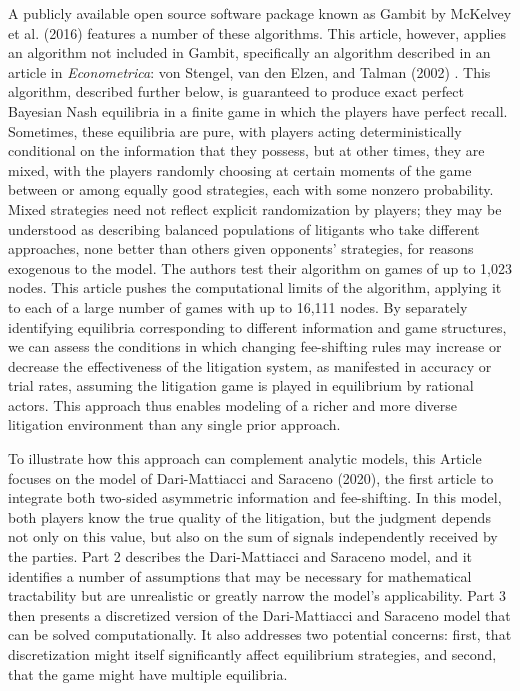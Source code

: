 \documentclass{article}
\begin{document}
A publicly available open source software package known as Gambit by McKelvey et al. (2016) \cite{mckelvey} features a number of these algorithms. This article, however, applies an algorithm not included in Gambit, specifically an algorithm described in an article in \textit{Econometrica}: von Stengel, van den Elzen, and Talman (2002) \cite{vonstengelvandenelzentalman}. This algorithm, described further below, is guaranteed to produce exact perfect Bayesian Nash equilibria in a finite game in which the players have perfect recall. Sometimes, these equilibria are pure, with players acting deterministically conditional on the information that they possess, but at other times, they are mixed, with the players randomly choosing at certain moments of the game between or among equally good strategies, each with some nonzero probability. Mixed strategies need not reflect explicit randomization by players; they may be understood as describing balanced populations of litigants who take different approaches, none better than others given opponents' strategies, for reasons exogenous to the model. The authors test their algorithm on games of up to 1,023 nodes. This article pushes the computational limits of the algorithm, applying it to each of a large number of games with up to 16,111 nodes. By separately identifying equilibria corresponding to different information and game structures, we can assess the conditions in which changing fee-shifting rules may increase or decrease the effectiveness of the litigation system, as manifested in accuracy or trial rates, assuming the litigation game is played in equilibrium by rational actors. This approach thus enables modeling of a richer and more diverse litigation environment than any single prior approach.

To illustrate how this approach can complement analytic models, this Article focuses on the model of Dari-Mattiacci and Saraceno (2020), the first article to integrate both two-sided asymmetric information and fee-shifting. In this model, both players know the true quality of the litigation, but the judgment depends not only on this value, but also on the sum of signals independently received by the parties. Part 2 describes the Dari-Mattiacci and Saraceno model, and it identifies a number of assumptions that may be necessary for mathematical tractability but are unrealistic or greatly narrow the model's applicability. Part 3 then presents a discretized version of the Dari-Mattiacci and Saraceno model that can be solved computationally. It also addresses two potential concerns: first, that discretization might itself significantly affect equilibrium strategies, and second, that the game might have multiple equilibria.
\end{document}
